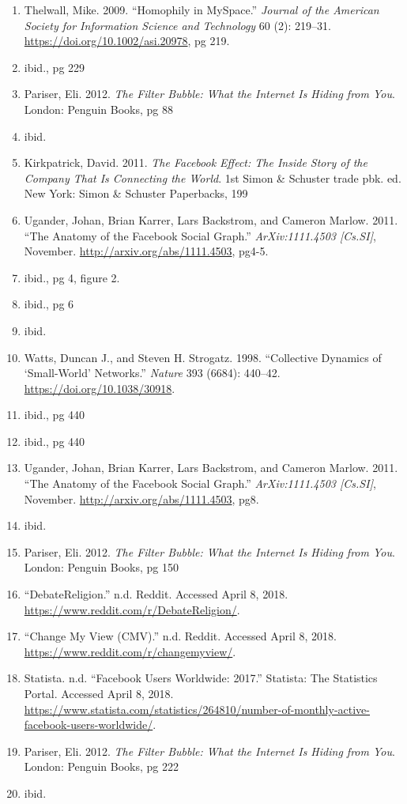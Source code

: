 \documentclass[]{article}
\providecommand{\tightlist}{%
  \setlength{\itemsep}{0pt}\setlength{\parskip}{0pt}}
\begin{document}
\begin{enumerate}
\def\labelenumi{\arabic{enumi}.}
\setcounter{enumi}{20}
\tightlist
\item
  Thelwall, Mike. 2009. ``Homophily in MySpace.'' \emph{Journal of the
  American Society for Information Science and Technology} 60 (2):
  219--31. \url{https://doi.org/10.1002/asi.20978}, pg 219.
\item
  ibid., pg 229
\item
  Pariser, Eli. 2012. \emph{The Filter Bubble: What the Internet Is
  Hiding from You}. London: Penguin Books, pg 88
\item
  ibid.
\item
  Kirkpatrick, David. 2011. \emph{The Facebook Effect: The Inside Story
  of the Company That Is Connecting the World}. 1st Simon \& Schuster
  trade pbk. ed. New York: Simon \& Schuster Paperbacks, 199
\item
  Ugander, Johan, Brian Karrer, Lars Backstrom, and Cameron Marlow.
  2011. ``The Anatomy of the Facebook Social Graph.''
  \emph{ArXiv:1111.4503 {[}Cs.SI{]}}, November.
  \url{http://arxiv.org/abs/1111.4503}, pg4-5.
\item
  ibid., pg 4, figure 2.
\item
  ibid., pg 6
\item
  ibid.
\item
  Watts, Duncan J., and Steven H. Strogatz. 1998. ``Collective Dynamics
  of `Small-World' Networks.'' \emph{Nature} 393 (6684): 440--42.
  \url{https://doi.org/10.1038/30918}.
\item
  ibid., pg 440
\item
  ibid., pg 440
\item
  Ugander, Johan, Brian Karrer, Lars Backstrom, and Cameron Marlow.
  2011. ``The Anatomy of the Facebook Social Graph.''
  \emph{ArXiv:1111.4503 {[}Cs.SI{]}}, November.
  \url{http://arxiv.org/abs/1111.4503}, pg8.
\item
  ibid.
\item
  Pariser, Eli. 2012. \emph{The Filter Bubble: What the Internet Is
  Hiding from You}. London: Penguin Books, pg 150
\item
  ``DebateReligion.'' n.d. Reddit. Accessed April 8, 2018.
  \url{https://www.reddit.com/r/DebateReligion/}.
\item
  ``Change My View (CMV).'' n.d. Reddit. Accessed April 8, 2018.
  \url{https://www.reddit.com/r/changemyview/}.
\item
  Statista. n.d. ``Facebook Users Worldwide: 2017.'' Statista: The
  Statistics Portal. Accessed April 8, 2018.
  \url{https://www.statista.com/statistics/264810/number-of-monthly-active-facebook-users-worldwide/}.
\item
  Pariser, Eli. 2012. \emph{The Filter Bubble: What the Internet Is
  Hiding from You}. London: Penguin Books, pg 222
\item
  ibid.
\end{enumerate}
\end{document}
